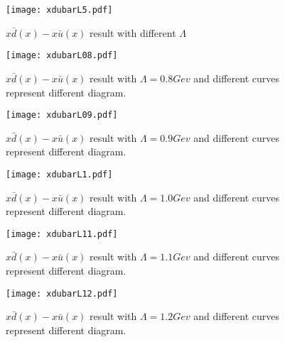 \documentclass[preprintnumbers,prd,superscriptaddress,preprint]{revtex4-1}
\begin{document}
	\begin{figure}[h]
		\begin{center}
			\texttt{[image: xdubarL5.pdf]}
			\caption{$x\bar{d}(x)-x\bar{u}(x)$ result with different $\Lambda$} 
			\label{x5Lambda}
		\end{center}
	\end{figure}
	
	\begin{figure}[h]
		\begin{center}
			\texttt{[image: xdubarL08.pdf]}
			\caption{$x\bar{d}(x)-x\bar{u}(x)$ result with $\Lambda=0.8Gev$ and different curves represent different diagram.} 
			\label{x08Lambda}
		\end{center}
	\end{figure}
	
	\begin{figure}[h]
		\begin{center}
			\texttt{[image: xdubarL09.pdf]}
			\caption{$x\bar{d}(x)-x\bar{u}(x)$ result with $\Lambda=0.9Gev$ and different curves represent different diagram.} 
			\label{x09Lambda}
		\end{center}
	\end{figure}
	
	\begin{figure}[h]
		\begin{center}
			\texttt{[image: xdubarL1.pdf]}
			\caption{$x\bar{d}(x)-x\bar{u}(x)$ result with $\Lambda=1.0Gev$ and different curves represent different diagram.} 
			\label{x1Lambda}
		\end{center}
	\end{figure}
	
	\begin{figure}[h]
		\begin{center}
			\texttt{[image: xdubarL11.pdf]}
			\caption{$x\bar{d}(x)-x\bar{u}(x)$ result with $\Lambda=1.1Gev$ and different curves represent different diagram.} 
			\label{x11Lambda}
		\end{center}
	\end{figure}
	\begin{figure}[h]
		\begin{center}
			\texttt{[image: xdubarL12.pdf]}
			\caption{$x\bar{d}(x)-x\bar{u}(x)$ result with $\Lambda=1.2Gev$ and different curves represent different diagram.} 
			\label{x12Lambda}
		\end{center}
	\end{figure}
\end{document}
